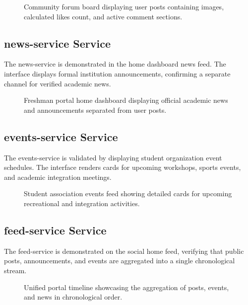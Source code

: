 \documentclass[12pt]{article}
\begin{document}
\begin{figure}[htbp]
    \centering
    \caption{Community forum board displaying user posts containing images, calculated likes count, and active comment sections.}
    \label{fig:social_feed}
\end{figure}

\subsection{news-service Service}
The news-service is demonstrated in the home dashboard news feed. The interface displays formal institution announcements, confirming a separate channel for verified academic news.

\begin{figure}[htbp]
    \centering
    \caption{Freshman portal home dashboard displaying official academic news and announcements separated from user posts.}
    \label{fig:news_feed}
\end{figure}

\subsection{events-service Service}
The events-service is validated by displaying student organization event schedules. The interface renders cards for upcoming workshops, sports events, and academic integration meetings.

\begin{figure}[htbp]
    \centering
    \caption{Student association events feed showing detailed cards for upcoming recreational and integration activities.}
    \label{fig:events_cards}
\end{figure}

\subsection{feed-service Service}
The feed-service is demonstrated on the social home feed, verifying that public posts, announcements, and events are aggregated into a single chronological stream.

\begin{figure}[htbp]
    \centering
    \caption{Unified portal timeline showcasing the aggregation of posts, events, and news in chronological order.}
    \label{fig:unified_feed}
\end{figure}
\end{document}
